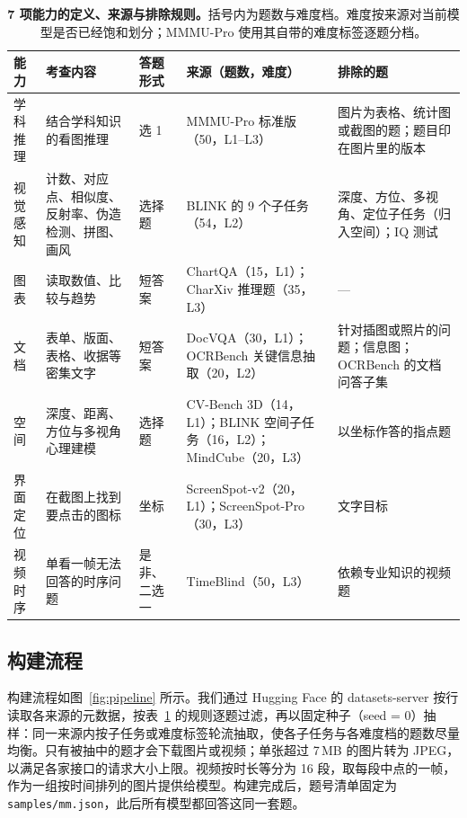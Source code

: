 \documentclass[11pt,a4paper,fontset=none]{ctexart}
\begin{document}
\begin{table}[t]
  \centering
  \caption{\textbf{7 项能力的定义、来源与排除规则。}括号内为题数与难度档。难度按来源对当前模型是否已经饱和划分；MMMU-Pro 使用其自带的难度标签逐题分档。}
  \label{tab:caps}
  \small
  \begin{tabularx}{\linewidth}{@{}l>{\raggedright\arraybackslash}X>{\raggedright\arraybackslash}p{1.6cm}>{\raggedright\arraybackslash}p{3.6cm}>{\raggedright\arraybackslash}X@{}}
    \toprule
    能力 & 考查内容 & 答题形式 & 来源（题数，难度） & 排除的题 \\
    \midrule
    学科推理 & 结合学科知识的看图推理 & 10 选 1 & MMMU-Pro 标准版（50，L1--L3） & 图片为表格、统计图或截图的题；题目印在图片里的版本 \\
    视觉感知 & 计数、对应点、相似度、反射率、伪造检测、拼图、画风 & 选择题 & BLINK 的 9 个子任务（54，L2） & 深度、方位、多视角、定位子任务（归入空间）；IQ 测试 \\
    图表 & 读取数值、比较与趋势 & 短答案 & ChartQA（15，L1）；CharXiv 推理题（35，L3） & — \\
    文档 & 表单、版面、表格、收据等密集文字 & 短答案 & DocVQA（30，L1）；OCRBench 关键信息抽取（20，L2） & 针对插图或照片的问题；信息图；OCRBench 的文档问答子集 \\
    空间 & 深度、距离、方位与多视角心理建模 & 选择题 & CV-Bench 3D（14，L1）；BLINK 空间子任务（16，L2）；MindCube（20，L3） & 以坐标作答的指点题 \\
    界面定位 & 在截图上找到要点击的图标 & 坐标 & ScreenSpot-v2（20，L1）；ScreenSpot-Pro（30，L3） & 文字目标 \\
    视频时序 & 单看一帧无法回答的时序问题 & 是非、二选一 & TimeBlind（50，L3） & 依赖专业知识的视频题 \\
    \bottomrule
  \end{tabularx}
\end{table}

\subsection{构建流程}

构建流程如图~\ref{fig:pipeline} 所示。我们通过 Hugging Face 的 datasets-server 按行读取各来源的元数据，按表~\ref{tab:caps} 的规则逐题过滤，再以固定种子（seed = 0）抽样：同一来源内按子任务或难度标签轮流抽取，使各子任务与各难度档的题数尽量均衡。只有被抽中的题才会下载图片或视频；单张超过 7\,MB 的图片转为 JPEG，以满足各家接口的请求大小上限。视频按时长等分为 16 段，取每段中点的一帧，作为一组按时间排列的图片提供给模型。构建完成后，题号清单固定为 \texttt{samples/mm.json}，此后所有模型都回答这同一套题。
\end{document}
